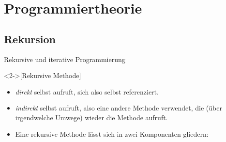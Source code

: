 \section{Programmiertheorie}
\subsection{Rekursion}
\begin{frame}{Rekursive und iterative Programmierung}
    \begin{definition}<2->[Rekursive Methode]
         \begin{itemize}
            \item<4-> \emph{direkt} selbst aufruft, sich also selbst referenziert.
            \item<5-> \emph{indirekt} selbst aufruft, also eine andere Methode verwendet, die (über irgendwelche Umwege) wieder die Methode aufruft.
        \end{itemize}
    \end{definition}
    \begin{itemize}
        \widei
        \item<6-> Eine rekursive Methode lässt sich in zwei Komponenten gliedern: 
    \end{itemize}
\end{frame}

